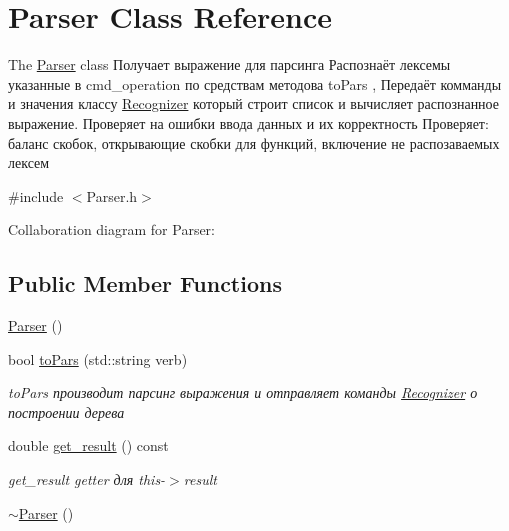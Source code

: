\hypertarget{classParser}{}\section{Parser Class Reference}
\label{classParser}


The \hyperlink{classParser}{Parser} class Получает выражение для парсинга Распознаёт лексемы указанные в cmd\+\_\+operation по средствам методова to\+Pars , Передаёт комманды и значения классу \hyperlink{classRecognizer}{Recognizer} который строит список и вычисляет распознанное выражение. Проверяет на ошибки ввода данных и их корректность Проверяет\+: баланс скобок, открывающие скобки для функций, включение не распозаваемых лексем  




{\ttfamily \#include $<$Parser.\+h$>$}



Collaboration diagram for Parser\+:
\subsection*{Public Member Functions}
\begin{DoxyCompactItemize}
\item 
\hyperlink{classParser_a12234f6cd36b61af4b50c94a179422c1}{Parser} ()
\item 
bool \hyperlink{classParser_a0979afe597b9164b2c1f321631b2d85f}{to\+Pars} (std\+::string verb)
\begin{DoxyCompactList}\small\item\em to\+Pars производит парсинг выражения и отправляет команды \hyperlink{classRecognizer}{Recognizer} о построении дерева \end{DoxyCompactList}\item 
double \hyperlink{classParser_a9ec78022f7acbb77f6e1dad63cadd252}{get\+\_\+result} () const 
\begin{DoxyCompactList}\small\item\em get\+\_\+result getter для this-\/$>$result \end{DoxyCompactList}\item 
\hyperlink{classParser_a3e658b5917a93a3ef648050d060e3a93}{$\sim$\+Parser} ()
\end{DoxyCompactItemize}
